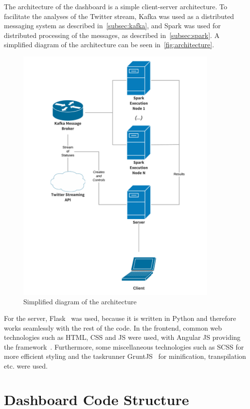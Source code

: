 The architecture of the dashboard is a simple client-server architecture.
To facilitate the analyses of the Twitter stream,
Kafka was used as a distributed messaging system as described in~\autoref{subsec:kafka},
and Spark was used for distributed processing of the messages, as described in~\autoref{subsec:spark}.
A simplified diagram of the architecture can be seen in~\autoref{fig:architecture}.

\begin{figure}
    \centering
    \caption{Simplified diagram of the architecture}
    \label{fig:architecture}
    \includegraphics[width=10cm]{../figures/architecture.pdf}
\end{figure}

For the server, Flask~\cite{flaskDocs} was used, because it is written in Python and therefore works seamlessly with the rest of the code.
In the frontend, common web technologies such as HTML, CSS and JS were used, with Angular JS providing the framework~\cite{angularDocs}.
Furthermore, some miscellaneous technologies such as SCSS\cite{scssDocs} for more efficient styling and the taskrunner GruntJS~\cite{gruntDocs} for
minification, transpilation etc. were used.

\section{Dashboard Code Structure}
\label{sec:dashboardCodeStructure}

